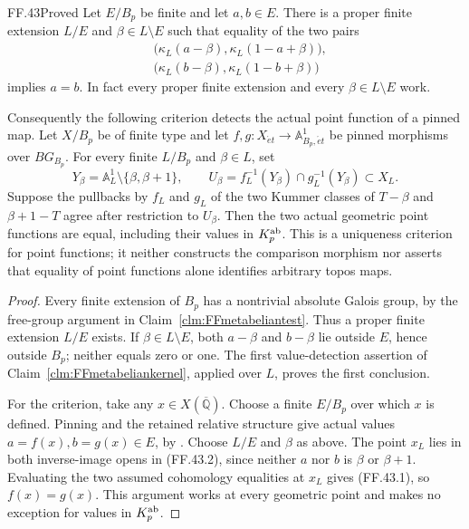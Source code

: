 \begin{claim}{FF.43}{Proved}\label{clm:FFmetabelianpointdetection}
Let \(E/B_p\) be finite and let
\(a,b\in E\). There is a proper
finite extension \(L/E\) and
\(\beta\in L\setminus E\) such
that equality of the two pairs
\[
 \begin{split}
 &\bigl(\kappa_L(a-\beta),
                  \kappa_L(1-a+\beta)\bigr),\\
 &\bigl(\kappa_L(b-\beta),
                  \kappa_L(1-b+\beta)\bigr)
 \end{split}
                                                        \tag{FF.43.1}
\]
implies \(a=b\). In fact every
proper finite extension and every
\(\beta\in L\setminus E\) work.

Consequently the following criterion
detects the actual point function of
a pinned map. Let \(X/B_p\) be
of finite type and let
\(f,g:X_{\acute et}\to\mathbb A^1_{B_p,\acute et}\)
be pinned morphisms over \(BG_{B_p}\).
For every finite \(L/B_p\) and
\(\beta\in L\), set
\[
 Y_\beta=\mathbb A^1_L\setminus\{\beta,\beta+1\},
 \qquad
 U_\beta=f_L^{-1}(Y_\beta)\cap g_L^{-1}(Y_\beta)
                         \subset X_L.
                                                        \tag{FF.43.2}
\]
Suppose the pullbacks by \(f_L\)
and \(g_L\) of the two Kummer
classes of \(T-\beta\) and
\(\beta+1-T\) agree after restriction
to \(U_\beta\). Then the two
actual geometric point functions
are equal, including their values
in \(K_p^{\rm ab}\).
This is a uniqueness criterion for
point functions; it neither constructs
the comparison morphism nor asserts
that equality of point functions
alone identifies arbitrary topos maps.
\end{claim}
\begin{proof}
Every finite extension of \(B_p\)
has a nontrivial absolute Galois
group, by the free-group argument
in Claim~\ref{clm:FFmetabeliantest}.
Thus a proper finite extension
\(L/E\) exists. If
\(\beta\in L\setminus E\), both
\(a-\beta\) and \(b-\beta\)
lie outside \(E\), hence outside
\(B_p\); neither equals zero or
one. The first value-detection
assertion of
Claim~\ref{clm:FFmetabeliankernel},
applied over \(L\), proves the
first conclusion.

For the criterion, take any
\(x\in X(\overline{\mathbb Q})\).
Choose a finite \(E/B_p\) over
which \(x\) is defined. Pinning
and the retained relative structure
give actual values
\(a=f(x),b=g(x)\in E\), by
\citep[Proposition~3.6]{FF_CHW2024}.
Choose \(L/E\) and \(\beta\)
as above. The point \(x_L\)
lies in both inverse-image opens
in (FF.43.2), since neither \(a\)
nor \(b\) is \(\beta\) or
\(\beta+1\). Evaluating the two
assumed cohomology equalities at
\(x_L\) gives (FF.43.1), so
\(f(x)=g(x)\). This argument
works at every geometric point
and makes no exception for values
in \(K_p^{\rm ab}\).
\end{proof}

